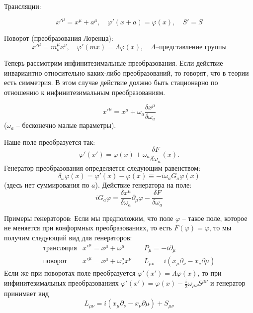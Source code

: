 \documentclass[a4paper,12pt]{article} \usepackage[utf8x]{inputenc} \usepackage[russian]{babel}
\theoremstyle{definition} \newtheorem{corollary}{Corollary}[theorem] \theoremstyle{definition}
\begin{document}
Трансляции:

\begin{equation*}
  \label{eq:306} x'^{\mu}=x^{\mu}+a^{\mu},\quad \varphi'(x+a)=\varphi(x),\quad S'=S
\end{equation*}

Поворот (преобразования Лоренца):
\begin{equation*} x'^{\mu}=m^{\mu}_{\nu} x^{\nu}, \quad \varphi'(m x)=\Lambda \varphi(x),\quad
\Lambda \mbox{--представление группы}
\end{equation*}

Теперь рассмотрим инфинитезимальные преобразования. Если действие инвариантно относительно
каких-либо преобразований, то говорят, что в теории есть симметрия. В этом случае действие должно
быть стационарно по отношению к инфинитезимальным преобразованиям.

\begin{equation}
  \label{eq:165} x'^{\mu}=x^{\mu}+\omega_a \frac{\delta x^{\mu}}{\delta \omega_a}
\end{equation} ($\omega_{a}$ -- бесконечно малые параметры).

Наше поле преобразуется так:
\begin{equation}
  \label{eq:166} \varphi'(x')=\varphi(x)+\omega_a \frac{\delta F}{\delta \omega_a} (x).
\end{equation} Генератор преобразования определяется следующим равенством:
\begin{equation}
  \label{eq:167} \delta_{\omega} \varphi(x)=\varphi'(x)-\varphi(x)\equiv -i\omega_a G_a \varphi(x)
\end{equation} (здесь нет суммирования по $a$). Действие генератора на поле:
\begin{equation}
  \label{eq:168} iG_a \varphi=\frac{\delta
x^{\mu}}{\delta\omega_a} \partial_{\mu}\varphi-\frac{\delta F}{\delta \omega_a}
\end{equation}

Примеры генераторов: Если мы предположим, что поле $\varphi$ -- такое поле, которое не меняется при
конформных преобразованиях, то есть $F(\varphi)=\varphi$, то мы получим следующий вид для
генераторов:
\begin{eqnarray}
  \label{eq:169} \mbox{трансляция} & x'^{\mu}=x^{\mu}+\omega^{\mu}& \quad P_{\mu}=-i\partial_{\mu}\\
\mbox{поворот} & x'^{\mu}=x^{\mu}+\omega^{\mu}_{\nu}x^{\nu} & \quad
L_{\mu\nu}=i(x_{\mu}\partial_{\nu}-x_{\nu}\partial{\mu})
\end{eqnarray} Если же при поворотах поле преобразуется $\varphi'(x')=\Lambda\varphi(x)$, то при
инфинитезимальных преобразованиях $\varphi'(x')=\varphi(x)-\frac{i}{2}\omega_{\mu\nu}S^{\mu\nu}$ и
генератор принимает вид
\begin{equation*} L_{\mu\nu}=i(x_{\mu}\partial_{\nu}-x_{\nu}\partial{\mu})+S_{\mu\nu}
\end{equation*}
\end{document}

